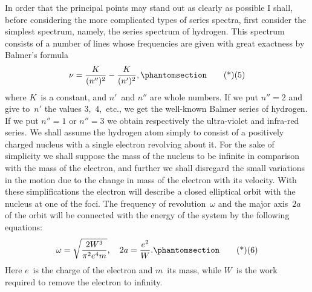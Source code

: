  In order that the principal points may
stand out as clearly as possible I shall, before considering the more
complicated types of series spectra, first consider the simplest spectrum,
namely, the series spectrum of hydrogen. This spectrum
consists of a number of lines whose frequencies are given with great
exactness by Balmer's formula
\[
\nu = \frac{K}{(n'')^{2}} - \frac{K}{(n')^{2}},
\Tag{(5)}
\]
where $K$~is a constant, and $n'$~and $n''$ are whole numbers. If we put
$n'' = 2$ and give to~$n'$ the values $3$,~$4$,~etc., we get the well-known
Balmer series of hydrogen. If we put $n'' = 1$ or $n'' = 3$ we obtain
respectively the ultra-violet and infra-red series. We shall assume
the hydrogen atom simply to consist of a positively charged nucleus
with a single electron revolving about it. For the sake of simplicity
we shall suppose the mass of the nucleus to be infinite in comparison
with the mass of the electron, and further we shall disregard the
small variations in the motion due to the change in mass of the
electron with its velocity. With these simplifications the electron
will describe a closed elliptical orbit with the nucleus at one of the
foci. The frequency of revolution~$\omega$ and the major axis~$2a$ of the
orbit will be connected with the energy of the system by the following
equations:
\[
\omega = \sqrt{\frac{2W^{3}}{\pi^{2} e^{4} m}},\quad
2a = \frac{e^{2}}{W}.
\Tag{(6)}
\]
Here $e$~is the charge of the electron and $m$~its mass, while $W$~is the
work required to remove the electron to infinity.

